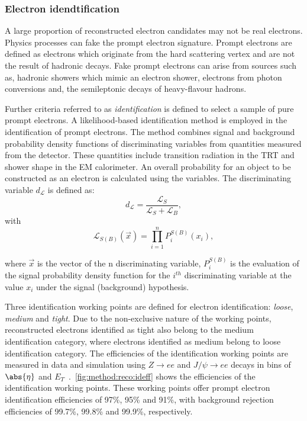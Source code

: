 \subsubsection{Electron idendtification}
A large proportion of reconstructed electron candidates may not be real electrons. Physics processes can fake the prompt electron signature. Prompt electrons are defined as electrons which originate from the hard scattering vertex and are not the result of hadronic decays. Fake prompt electrons can arise from sources such as, hadronic showers which mimic an electron shower, electrons from photon conversions and, the semileptonic decays of heavy-flavour hadrons.

Further criteria referred to as \emph{identification} is defined to select a sample of pure prompt electrons. A likelihood-based identification method is employed in the identification of prompt electrons. The method combines signal and background probability density functions of discriminating variables from quantities measured from the detector. These quantities include transition radiation in the TRT and shower shape in the EM calorimeter. An overall probability for an object to be constructed as an electron is calculated using the variables. The discriminating variable $d_\mathcal{L}$ is defined as:
\begin{equation}
    d_{\mathcal{L}} = \frac{\mathcal{L}_S}{\mathcal{L}_S + \mathcal{L}_B},  
\end{equation}
with 
\begin{equation}
    \mathcal{L}_{S(B)}(\overrightarrow{x}) = \prod_{i=1}^{n} P_{i}^{S(B)} (x_{i}),
\end{equation}

where $\overrightarrow{x}$ is the vector of the n discriminating variable, $P_{i}^{S(B)}$ is the evaluation of the signal probability density function for the $i^{th}$ discriminating variable at the value $x_i$ under the signal (background) hypothesis. 

Three identification working points are defined for electron identification: \emph{loose}, \emph{medium} and \emph{tight}. Due to the non-exclusive nature of the working points, reconstructed electrons identified as tight also belong to the medium identification category, where electrons identified as medium belong to loose identification category. The efficiencies of the identification working points are measured in data and simulation using $Z \rightarrow ee$ and $J/\psi \rightarrow ee$ decays in bins of $\abs{\eta}$ and $E_T$~\cite{Aad:2019tso}.~\cref{fig:method:reco:ideff} shows the efficiencies of the identification working points. These working points offer prompt electron identification efficiencies of 97\%, 95\% and 91\%, with background rejection efficiencies of 99.7\%, 99.8\% and 99.9\%, respectively. 

